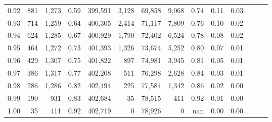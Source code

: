 \begin{tabular}{rrrrrrrrrrrrrr}
0.92 &    881 &  1,273 &  0.59 &  399,591 &    3,128 &  69,858 &   9,068 &  0.74 &  0.11 &      0.03 \\
0.93 &    714 &  1,259 &  0.64 &  400,305 &    2,414 &  71,117 &   7,809 &  0.76 &  0.10 &      0.02 \\
0.94 &    624 &  1,285 &  0.67 &  400,929 &    1,790 &  72,402 &   6,524 &  0.78 &  0.08 &      0.02 \\
0.95 &    464 &  1,272 &  0.73 &  401,393 &    1,326 &  73,674 &   5,252 &  0.80 &  0.07 &      0.01 \\
0.96 &    429 &  1,307 &  0.75 &  401,822 &      897 &  74,981 &   3,945 &  0.81 &  0.05 &      0.01 \\
0.97 &    386 &  1,317 &  0.77 &  402,208 &      511 &  76,298 &   2,628 &  0.84 &  0.03 &      0.01 \\
0.98 &    286 &  1,286 &  0.82 &  402,494 &      225 &  77,584 &   1,342 &  0.86 &  0.02 &      0.00 \\
0.99 &    190 &    931 &  0.83 &  402,684 &       35 &  78,515 &     411 &  0.92 &  0.01 &      0.00 \\
1.00 &     35 &    411 &  0.92 &  402,719 &        0 &  78,926 &       0 &   nan &  0.00 &      0.00 \\
\bottomrule
\end{tabular}
